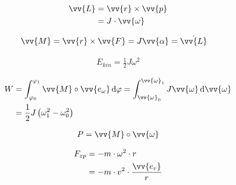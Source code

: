 \begin{boxleft}
\end{boxleft}\begin{boxrightshaded}
\begin{align}
\vv{L}&=\vv{r}\times\vv{p} \\
&=J\cdot \vv{\omega}
\end{align}
\end{boxrightshaded}

\begin{boxleft}
\end{boxleft}\begin{boxrightshaded}
\begin{align}
\vv{M}&=\vv{r}\times\vv{F}=J\vv{\alpha}=\dot{\vv{L}}
\end{align}
\end{boxrightshaded}

\begin{boxleft}
\end{boxleft}\begin{boxrightshaded}
\begin{align}
E_{kin}=\frac{1}{2}J\omega^2
\end{align}
\end{boxrightshaded}

\begin{boxleft}
\end{boxleft}\begin{boxrightshaded}
\begin{align}
W	&=\int_{\varphi_0}^{\varphi_1}\vv{M}\circ\vv{e_\omega}\diff \varphi=\int_{\vv{\omega}_0}^{\vv{\omega}_1}J\vv{\omega}\diff\vv{\omega}\\
&=\frac{1}{2}J\left(\omega_1^2-\omega_0^2\right)
\end{align}
\end{boxrightshaded}


\begin{boxleft}
\end{boxleft}\begin{boxrightshaded}
\begin{align}
P=\vv{M}\circ\vv{\omega}
\end{align}
\end{boxrightshaded}

\begin{boxleft}
\end{boxleft}\begin{boxrightshaded}
\begin{align}
F_{zp}&=-m\cdot\omega^2\cdot r\\
&=-m\cdot v^2\cdot \frac{\vv{e_r}}{r}
\end{align}
\end{boxrightshaded}

